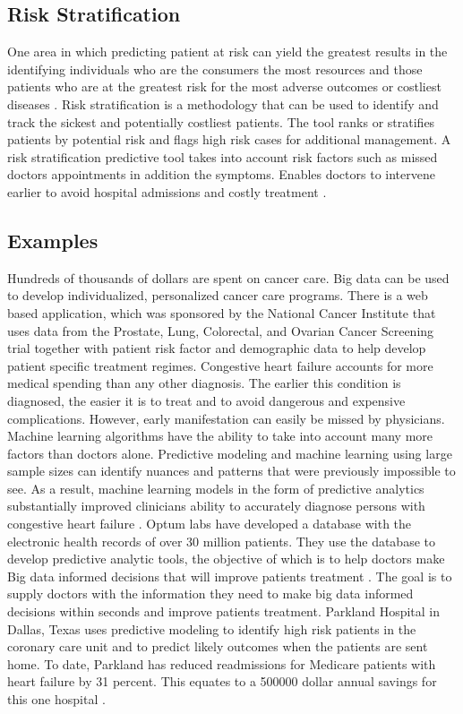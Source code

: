 \documentclass[sigconf]{acmart}
\begin{document}
{\subsection{Risk Stratification}
One area in which predicting patient at risk can yield the greatest results in the identifying individuals who are the consumers the most resources and those patients who are at the greatest risk for the most adverse outcomes or costliest diseases \cite{springer}. Risk stratification is a methodology that can be used to identify and track the sickest and potentially costliest patients. The tool ranks or stratifies patients by potential risk and flags high risk cases for additional management. A risk stratification predictive tool takes into account risk factors such as missed doctors appointments in addition the symptoms. Enables doctors to intervene earlier to avoid hospital admissions and costly treatment \cite{datafloq}. 
\subsection{Examples}  
Hundreds of thousands of dollars are spent on cancer care. Big data can be used to develop individualized, personalized cancer care programs. There is a web based application, which was sponsored by the National Cancer Institute that uses data from the Prostate, Lung, Colorectal, and Ovarian Cancer Screening trial together with patient risk factor and demographic data to help develop patient specific treatment regimes. 
Congestive heart failure accounts for more medical spending than any other diagnosis. The earlier this condition is diagnosed, the easier it is to treat and to avoid dangerous and expensive complications.  However, early manifestation can easily be missed by physicians. Machine learning algorithms have the ability to take into account many more factors than doctors alone. Predictive modeling and machine learning using large sample sizes can identify nuances and patterns that were previously impossible to see.  As a result, machine learning models in the form of predictive analytics substantially improved clinicians ability to accurately diagnose persons with congestive heart failure \cite{www-google-datapine}. 
Optum labs have developed a database with the electronic health records of over 30 million patients. They use the database to develop predictive analytic tools, the objective of which is to help doctors make Big data informed decisions that will improve patients treatment \cite{www-google-McDonald}.  The goal is to supply doctors with the information they need to make big data informed decisions within seconds and improve patients treatment. 
Parkland Hospital in Dallas, Texas uses predictive modeling to identify high risk patients in the coronary care unit and to predict likely outcomes when the patients are sent home. To date, Parkland has reduced readmissions for Medicare patients with heart failure by 31 percent. This equates to a 500000 dollar annual savings for this one hospital \cite{www-google-datafloq}. 
  
}
\end{document}
